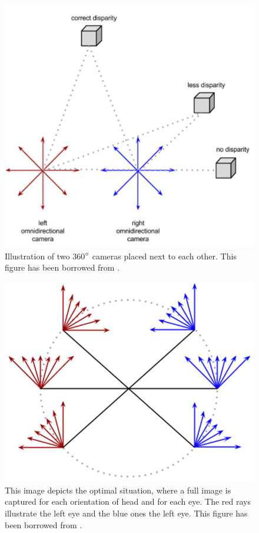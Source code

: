 \documentclass[10pt,twocolumn,letterpaper]{article}
\begin{document}
\begin{figure}[t]
\begin{center}
   \includegraphics[width=0.8\linewidth]{pictures/two_360.png}
\end{center}
   \caption{Illustration of two 360$\degree$ cameras placed next to each other. This figure has been borrowed from \cite{ods}.}
\label{two_360}
\end{figure}

\begin{figure}[t]
\begin{center}
   \includegraphics[width=0.5\linewidth]{pictures/wanted.png}
\end{center}
   \caption{This image depicts the optimal situation, where a full image is captured for each orientation of head and for each eye. The red rays illustrate the left eye and the blue ones the left eye. This figure has been borrowed from \cite{ods}.}
\label{wanted}
\end{figure}
\end{document}
